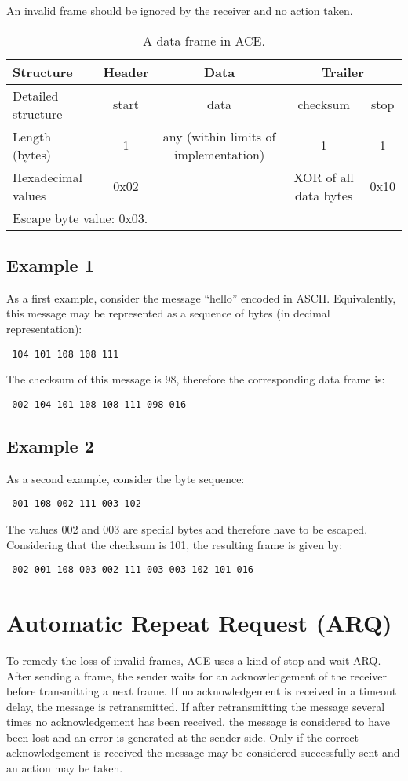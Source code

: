 \documentclass[10pt,a4paper]{article}
\begin{document}
An invalid frame should be ignored by the receiver and no action taken.

\begin{table}[ht]
 \begin{tabular}{|l||c|c|c|c|} \hline
 Structure & Header & Data & \multicolumn{2}{|c|}{Trailer} \\ \hline \hline
 Detailed structure & start & data & checksum & stop \\ \hline
 Length (bytes) & 1 & any (within limits of implementation) & 1 & 1 \\ \hline
 Hexadecimal values & 0x02 & & XOR  of all data bytes & 0x10 \\ \hline
 \multicolumn{5}{l}{Escape byte value: 0x03.} \\
 \end{tabular}
 
 \caption{A data frame in ACE.}
 \label{tab:frame}
\end{table}


\subsection{Example 1}
As a first example, consider the message ``hello'' encoded in ASCII. Equivalently, this message may be represented as a sequence of bytes (in decimal representation): \begin{verbatim} 104 101 108 108 111 \end{verbatim}
The checksum of this message is 98, therefore the corresponding data frame is:
\begin{verbatim} 002 104 101 108 108 111 098 016 \end{verbatim}

\subsection{Example 2}
As a second example, consider the byte sequence:
\begin{verbatim} 001 108 002 111 003 102 \end{verbatim}
The values 002 and 003 are special bytes and therefore have to be escaped. Considering that the checksum is 101, the resulting frame is given by:
\begin{verbatim} 002 001 108 003 002 111 003 003 102 101 016 \end{verbatim}

\section{Automatic Repeat Request (ARQ)}
To remedy the loss of invalid frames, ACE uses a kind of stop-and-wait ARQ. After sending a frame, the sender waits for an acknowledgement of the receiver before transmitting a next frame. If no acknowledgement is received in a timeout delay, the message is retransmitted. If after retransmitting the message several times no acknowledgement has been received, the message is considered to have been lost and an error is generated at the sender side. Only if the correct acknowledgement is received the message may be considered successfully sent and an action may be taken.
\end{document}
